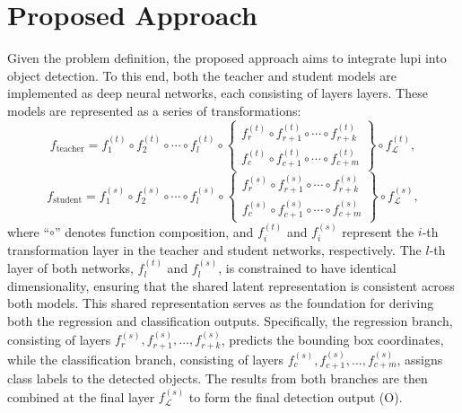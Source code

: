 \section{Proposed Approach}
\label{sec:4_proposed_approach}

Given the problem definition, the proposed approach aims to integrate \gls{lupi} into object detection. To this end, both the \gls{teacher} and \gls{student} models are implemented as deep neural networks, each consisting of \gls{layers} layers. These models are represented as a series of transformations:
\begin{equation}
f_{\text{teacher}} = f_1^{(t)} \circ f_2^{(t)} \circ \cdots \circ f_{l}^{(t)} \circ 
\left\{
  \begin{array}{l}
    f_r^{(t)} \circ f_{r+1}^{(t)} \circ \cdots \circ f_{r+k}^{(t)} \\
    f_c^{(t)} \circ f_{c+1}^{(t)} \circ \cdots \circ f_{c+m}^{(t)}
  \end{array}
\right\} \circ f_\mathcal{L}^{(t)},
\end{equation}
\begin{equation}
f_{\text{student}} = f_1^{(s)} \circ f_2^{(s)} \circ \cdots \circ f_{l}^{(s)} \circ 
\left\{
  \begin{array}{l}
    f_r^{(s)} \circ f_{r+1}^{(s)} \circ \cdots \circ f_{r+k}^{(s)} \\
    f_c^{(s)} \circ f_{c+1}^{(s)} \circ \cdots \circ f_{c+m}^{(s)}
  \end{array}
\right\} \circ f_\mathcal{L}^{(s)},
\end{equation}
where ``\( \circ \)'' denotes function composition, and \( f_i^{(t)} \) and \( f_i^{(s)} \) represent the \( i \)-th transformation layer in the teacher and student networks, respectively. The \( l \)-th layer of both networks, \( f_l^{(t)} \) and \( f_l^{(s)} \), is constrained to have identical dimensionality, ensuring that the shared latent representation is consistent across both models. This shared representation serves as the foundation for deriving both the regression and classification outputs. Specifically, the regression branch, consisting of layers \( f_r^{(s)}, f_{r+1}^{(s)}, \dots, f_{r+k}^{(s)} \), predicts the bounding box coordinates, while the classification branch, consisting of layers \( f_c^{(s)}, f_{c+1}^{(s)}, \dots, f_{c+m}^{(s)} \), assigns class labels to the detected objects. The results from both branches are then combined at the final layer \( f_\mathcal{L}^{(s)} \) to form the final detection output (\gls{O}).

